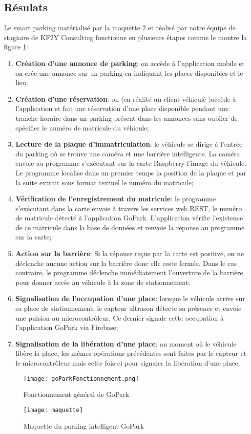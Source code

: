     \subsection{Résulats}
Le smart parking matérialisé par la maquette \ref{fig:maquette} et réalisé par notre équipe de stagiaire de KF2Y Consulting fonctionne en plusieurs étapes comme le montre la figure \ref{fig:fonctionnement}:
    \begin{enumerate}
        \item \textbf{Création d’une annonce de parking}: on accède à l’application mobile et on crée une annonce sur un parking en indiquant les places disponibles et le lieu;
        \item \textbf{Création d’une réservation}: on (en réalité un client véhiculé )accède à l’application et fait une réservation d’une place disponible pendant une tranche horaire dans un parking présent dans les annonces sans oublier de spécifier le numéro de matricule du véhicule;
        \item \textbf{Lecture de la plaque d'immatriculation}: le véhicule se dirige à l’entrée du parking où se trouve une caméra et une barrière intelligente. La caméra envoie au programme s'exécutant sur la carte Raspberry l’image du véhicule. Le programme localise dans un premier temps la position de la plaque et par la suite extrait sous format textuel le numéro du matricule;
        \item \textbf{Vérification de l'enregistrement du matricule}: le programme s'exécutant dans la carte envoie à travers les services web REST, le numéro de matricule détecté à l’application GoPark. L’application vérifie l’existence de ce matricule dans la base de données et renvoie la réponse au programme sur la carte;
        \item \textbf{Action sur la barrière}: Si la réponse reçue par la carte est positive, on ne déclenche aucune action sur la barrière donc elle reste fermée. Dans le cas contraire, le programme déclenche immédiatement l’ouverture de la barrière pour donner accès au véhicule à la zone de stationnement;
        \item \textbf{Signalisation de l’occupation d’une place}: lorsque le véhicule arrive sur sa place de stationnement, le capteur ultrason détecte sa présence et envoie une pulsion au microcontrôleur. Ce dernier signale  cette occupation à l’application GoPark via Firebase;
        \item \textbf{Signalisation de la libération d’une place}: au moment où le véhicule libère la place, les mêmes opérations précédentes sont faites par le capteur et le microcontrôleur mais cette fois-ci pour signaler la libération d'une place.
    \end{enumerate}
    \begin{figure}
        \centering
        \texttt{[image: goParkFonctionnement.png]}
        \caption{Fonctionnement général de GoPark}
        \label{fig:fonctionnement}
    \end{figure}
    
    \begin{figure}
        \centering
        \texttt{[image: maquette]}
        \caption{Maquette du parking intelligent GoPark}
        \label{fig:maquette}
    \end{figure}